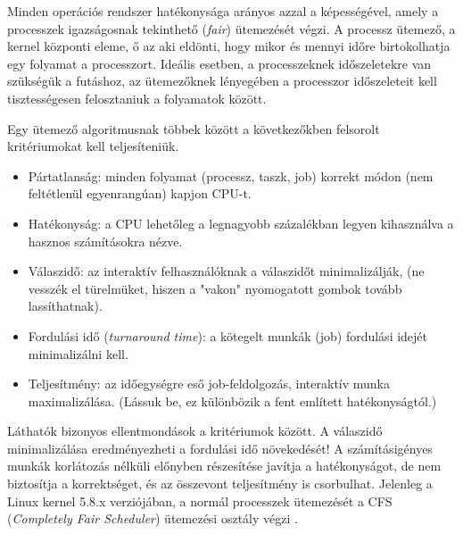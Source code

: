\label{ch:scheduling}


Minden operációs rendszer hatékonysága arányos azzal a képességével, amely a processzek igazságosnak tekinthető (\textit{fair}) ütemezését végzi. A processz ütemező, a kernel központi eleme, ő az aki eldönti, hogy mikor és mennyi időre birtokolhatja egy folyamat a processzort. Ideális esetben, a processzeknek időszeletekre van szükségük a futáshoz, az ütemezőknek lényegében a processzor időszeleteit kell tisztességesen felosztaniuk a folyamatok között.

Egy ütemező algoritmusnak többek között a következőkben felsorolt kritériumokat kell teljesíteniük.
\begin{itemize}
	\item Pártatlanság: minden folyamat (processz, taszk, job) korrekt módon (nem feltétlenül egyenrangúan) kapjon CPU-t.
	\item Hatékonyság: a CPU lehetőleg a legnagyobb százalékban legyen kihasználva a hasznos számításokra nézve.
	\item Válaszidő: az interaktív felhasználóknak a válaszidőt minimalizálják, (ne vesszék el türelmüket, hiszen a "vakon" nyomogatott gombok tovább lassíthatnak).
	\item Fordulási idő (\textit{turnaround time}): a kötegelt munkák (job) fordulási idejét minimalizálni kell.
	\item Teljesítmény: az időegységre eső job-feldolgozás, interaktív munka maximalizálása.
(Lássuk be, ez különbözik a fent említett hatékonyságtól.)
\end{itemize}
Láthatók bizonyos ellentmondások a kritériumok között. A válaszidő minimalizálása eredményezheti a fordulási idő növekedését!
A számításigényes munkák korlátozás nélküli
előnyben részesítése javítja a hatékonyságot, de nem biztosítja a korrektséget, és az összevont
teljesítmény is csorbulhat.
Jelenleg a Linux kernel 5.8.x verziójában, a normál processzek ütemezését a CFS (\textit{Completely Fair Scheduler}) ütemezési osztály végzi \cite{wong2008towards}.



